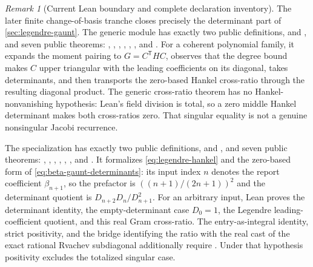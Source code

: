 \documentclass[11pt,oneside]{article}
\theoremstyle{definition}
\theoremstyle{remark}
\newtheorem{remark}[theorem]{Remark}
\numberwithin{equation}{section}
\begin{document}
\begin{remark}[Current Lean boundary and complete declaration inventory]
The later finite change-of-basis tranche closes precisely the determinant part of
\cref{sec:legendre-gaunt}.  The generic module
 has exactly two public definitions,
 and , and seven
public theorems:
,
,
,
,
,
, and
.
For a coherent polynomial family, it expands the moment pairing to
\(G=C^{\mathsf T}HC\), observes that the degree bound makes \(C\) upper
triangular with the leading coefficients on its diagonal, takes determinants, and
then transports the zero-based Hankel cross-ratio through the resulting diagonal
product.  The generic cross-ratio theorem has no Hankel-nonvanishing hypothesis:
Lean's field division is total, so a zero middle Hankel determinant makes both
cross-ratios zero.  That singular equality is not a genuine nonsingular Jacobi
recurrence.

The specialization  has exactly two
public definitions,  and , and
seven public theorems:
,
,
, ,
,
, and
.
It formalizes \cref{eq:legendre-hankel} and the zero-based form of
\cref{eq:beta-gaunt-determinants}: its input index \(n\) denotes the report
coefficient \(\beta_{n+1}\), so the prefactor is
\(((n+1)/(2n+1))^2\) and the determinant quotient is
\(D_{n+2}D_n/D_{n+1}^2\).  For an arbitrary  input, Lean proves
the determinant identity, the empty-determinant case \(D_0=1\), the Legendre
leading-coefficient quotient, and this real Gram cross-ratio.  The entry-as-integral
identity, strict positivity, and the bridge identifying the ratio with the real cast
of the exact rational Rvachev subdiagonal additionally require .
Under that hypothesis positivity excludes the totalized singular case.


\end{remark}
\end{document}
